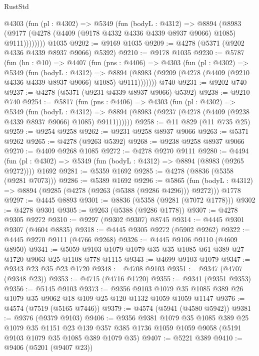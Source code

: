 \begin{lexlean}{RustStd}
\begin{coremodule}
        @4303
          (fun (pl : @4302) =>
          @5349
            (fun (bodyL : @4312) =>
            @8894
              (@8983 (@9177 (@4278 (@4409 (@9178 @4332 @4336 @4339 @8937 @9066) @1085) @9111))))))))
    @1035
@9202 := @9169 @1035
@9209 := @4278 (@5371 (@9202 @4336 @4339 @8937 @9066) @5392)
@9210 := @9178 @1035
@9230 := @5787
    (fun (hn : @10) =>
    @4407
      (fun (pns : @4406) =>
      @4303
        (fun (pl : @4302) =>
        @5349
          (fun (bodyL : @4312) =>
          @8894 (@8983 (@9209 (@4278 (@4409 (@9210 @4336 @4339 @8937 @9066) @1085) @9111)))))))
    @740
@9231 := @9202 @740
@9237 := @4278 (@5371 (@9231 @4339 @8937 @9066) @5392)
@9238 := @9210 @740
@9254 := @5817
    (fun (pns : @4406) =>
    @4303
      (fun (pl : @4302) =>
      @5349
        (fun (bodyL : @4312) =>
        @8894 (@8983 (@9237 (@4278 (@4409 (@9238 @4339 @8937 @9066) @1085) @9111))))))
@9258 := @11 @829 (@11 @735 @25)
@9259 := @9254 @9258
@9262 := @9231 @9258 @8937 @9066
@9263 := @5371 @9262
@9265 := @4278 (@9263 @5392)
@9268 := @9238 @9258 @8937 @9066
@9270 := @4409 @9268 @1085
@9272 := @4278 @9270 @9111
@9280 := @4494
    (fun (pl : @4302) => @5349 (fun (bodyL : @4312) => @8894 (@8983 (@9265 @9272))))
    @1692
@9281 := @5359 @1692
@9285 := @4278 (@8836 (@5358 (@9281 @7073)))
@9286 := @5389 @1692
@9296 := @5865
    (fun (bodyL : @4312) => @8894 (@9285 (@4278 (@9263 (@5388 (@9286 @4296))) @9272)))
    @1778
@9297 := @4445 @8893
@9301 := @8836 (@5358 (@9281 (@7072 @1778)))
@9302 := @4278 @9301
@9305 := @9263 (@5388 (@9286 @1778))
@9307 := @4278 @9305 @9272
@9310 := @9297 (@9302 @9307) @8745
@9314 := @4445 @9301 @9307 (@4604 @8835)
@9318 := @4445 @9305 @9272 (@5902 @9262)
@9322 := @4445 @9270 @9111 (@4766 @9268)
@9326 := @4445 @9106 @9110 (@4609 @8950)
@9341 := @5059 @9103 @1079 @1079 @35 @35 @1085 @61 @389 @27 @1720 @9063 @25 @1108 @778 @1115
@9343 := @4699 @9103 @1079
@9347 := @9343 @23 @35 @23 @1720
@9348 := @4708 @9103
@9351 := @9347 (@4707 (@9348 @23))
@9353 := @4715 (@4716 @1720)
@9355 := @9341 (@9351 @9353)
@9356 := @5145 @9103
@9373 := @9356
    @9103
    @1079
    @35
    @1085
    @389
    @26
    @1079
    @35
    @9062
    @18
    @109
    @25
    @120
    @1132
    @1059
    @1059
    @1147
@9376 := @4574 (@7519 (@5165 @7446))
@9379 := @4574 (@5941 (@4580 @5942))
@9381 := @9376 (@9379 @9103)
@9406 := @9356
    @9381
    @1079
    @35
    @1085
    @389
    @25
    @1079
    @35
    @1151
    @23
    @139
    @357
    @385
    @1736
    @1059
    @1059
    @9058
    (@5191 @9103 @1079 @35 @1085 @389 @1079 @35)
@9407 := @5221 @389
@9410 := @9406 (@5201 (@9407 @23))

\end{coremodule}
\end{lexlean}
